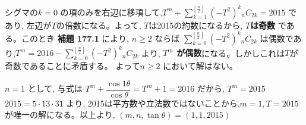 シグマの$k=0$ の項のみを右辺に移項して,$T^m+\displaystyle\sum_{k=1}^{\left\lfloor\frac{n}{2}\right\rfloor} (-T^2)^k{}_nC_{2k} =2015$ であり, 左辺が$T$の倍数になる。よって, $T$は2015の約数になるから, {\bf $T$は奇数} である。このとき {\bf 補題 177.1} により, $n\ge 2$ ならば $\displaystyle\sum_{k=0}^{\left\lfloor\frac{n}{2}\right\rfloor} (-T^2)^k{}_nC_{2k}$ は偶数であり,$T^m=2016-\displaystyle\sum_{k=0}^{\left\lfloor\frac{n}{2}\right\rfloor} (-T^2)^k{}_nC_{2k}$ より, {\bf $T^m$ が偶数}になる。しかしこれは$T$が奇数であることに矛盾する。 よって$n\ge 2$ において解はない。

$n=1$ として, 与式は $T^m+\dfrac{\cos{1\theta}}{\cos{\theta}}=T^m+1=2016$ だから, $T^m=2015$\\
$2015=5\cdot 13\cdot 31$ より, 2015は平方数や立法数ではないことから,$m=1, T=2015$ が唯一の解になる。以上より, $(m,n,\tan{\theta})=(1,1,2015)$

